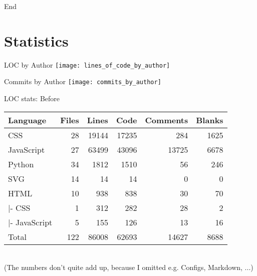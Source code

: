 
\addtocounter{framenumber}{1}
\begin{frame}[standout]
    \Huge
    End
\end{frame}

\appendix
\backupbegin

\section{Statistics}


\begin{frame}[c]{LOC by Author}
    \texttt{[image: lines\_of\_code\_by\_author]}
\end{frame}

\begin{frame}[c]{Commits by Author}
    \texttt{[image: commits\_by\_author]}
\end{frame}



\begin{frame}[c,fragile]{LOC stats: Before}
    \large
    \begin{tabular}{l:r:r:r:r:r}
        Language & Files & Lines & Code & Comments & Blanks \\ \hline
CSS           &        28 &      19144 &      17235 &        284 &       1625 \\
JavaScript    &        27 &      63499 &      43096 &      13725 &       6678 \\ \hdashline
Python        &        34 &       1812 &       1510 &         56 &        246 \\
SVG           &        14 &         14 &         14 &          0 &          0 \\ \hdashline
HTML          &        10 &        938 &        838 &         30 &         70 \\
|- CSS        &         1 &        312 &        282 &         28 &          2 \\
|- JavaScript &         5 &        155 &        126 &         13 &         16 \\ \hdashline
Total         &       122 &      86008 &      62693 &      14627 &       8688 \\
    \end{tabular} \\
    \scriptsize \newline (The numbers don't quite add up, because I omitted e.g. Configs, Markdown, ...)
\end{frame}

